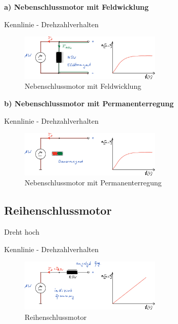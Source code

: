\textbf{a) Nebenschlussmotor mit Feldwicklung}

Kennlinie - Drehzahlverhalten

\begin{figure}[!ht]%
\centering
\includegraphics[width=0.6\textwidth]{images/Skizze/30_FT_Nebenschlussmotor_mit_Feldwicklung.pdf}
\caption{Nebenschlussmotor mit Feldwicklung}
\end{figure}

\textbf{b) Nebenschlussmotor mit Permanenterregung}

Kennlinie - Drehzahlverhalten

\begin{figure}[!ht]%
\centering
\includegraphics[width=0.6\textwidth]{images/Skizze/30_FT_Nebenschlussmotor_mit_Permanenterregung.pdf}
\caption{Nebenschlussmotor mit Permanenterregung}
\end{figure}

\subsection{Reihenschlussmotor}\label{reihenschlussmotor}

Dreht hoch

Kennlinie - Drehzahlverhalten

\begin{figure}[!ht]%
\centering
\includegraphics[width=0.6\textwidth]{images/Skizze/30_FT_Reihenschlussmotor.pdf}
\caption{Reihenschlussmotor}
\end{figure}

